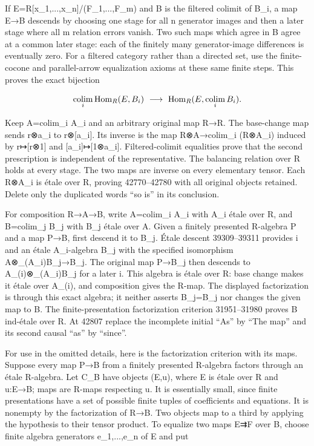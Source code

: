 If E=R{[}x\_1,...,x\_n{]}/(F\_1,...,F\_m) and B is the filtered colimit of B\_i, a map E→B descends by choosing one stage for all n generator images and then a later stage where all m relation errors vanish. Two such maps which agree in B agree at a common later stage: each of the finitely many generator-image differences is eventually zero. For a filtered category rather than a directed set, use the finite-cocone and parallel-arrow equalization axioms at these same finite steps. This proves the exact bijection

\[
\mathop{\rm colim}_i\operatorname{Hom}_R(E,B_i)
\ \longrightarrow\ \operatorname{Hom}_R(E,\mathop{\rm colim}_iB_i).
\]

Keep A=colim\_i A\_i and an arbitrary original map R→R\textquotesingle. The base-change map sends r\textquotesingle⊗a\_i to r\textquotesingle⊗{[}a\_i{]}. Its inverse is the map R\textquotesingle⊗A→colim\_i (R\textquotesingle⊗A\_i) induced by r\textquotesingle↦{[}r\textquotesingle⊗1{]} and {[}a\_i{]}↦{[}1⊗a\_i{]}. Filtered-colimit equalities prove that the second prescription is independent of the representative. The balancing relation over R holds at every stage. The two maps are inverse on every elementary tensor. Each R\textquotesingle⊗A\_i is étale over R\textquotesingle, proving 42770--42780 with all original objects retained. Delete only the duplicated words ``so is'' in its conclusion.

For composition R→A→B, write A=colim\_i A\_i with A\_i étale over R, and B=colim\_j B\_j with B\_j étale over A. Given a finitely presented R-algebra P and a map P→B, first descend it to B\_j. Étale descent 39309--39311 provides i and an étale A\_i-algebra B\textquotesingle\_j with the specified isomorphism A⊗\_(A\_i)B\textquotesingle\_j→B\_j. The original map P→B\_j then descends to A\_(i\textquotesingle)⊗\_(A\_i)B\textquotesingle\_j for a later i\textquotesingle. This algebra is étale over R: base change makes it étale over A\_(i\textquotesingle), and composition gives the R-map. The displayed factorization is through this exact algebra; it neither asserts B\textquotesingle\_j=B\_j nor changes the given map to B. The finite-presentation factorization criterion 31951--31980 proves B ind-étale over R. At 42807 replace the incomplete initial ``As'' by ``The map'' and its second causal ``as'' by ``since''.

For use in the omitted details, here is the factorization criterion with its maps. Suppose every map P→B from a finitely presented R-algebra factors through an étale R-algebra. Let C\_B have objects (E,u), where E is étale over R and u:E→B; maps are R-maps respecting u. It is essentially small, since finite presentations have a set of possible finite tuples of coefficients and equations. It is nonempty by the factorization of R→B. Two objects map to a third by applying the hypothesis to their tensor product. To equalize two maps E⇉F over B, choose finite algebra generators e\_1,...,e\_n of E and put

